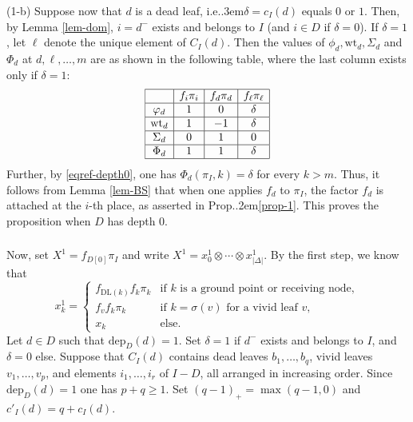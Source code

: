\documentclass[12pt]{amsart}
\numberwithin{equation}{section}
\theoremstyle{definition}
\def\Prop{Prop.\kern.2em}
\def\ie{{i.e.}\kern.3em}
\def\DL{\mathrm{DL}}  %
\def\dep{\mathrm{dep}} %
\def\wt{\mathrm{wt}}  %
\begin{document}
\smallskip (1-b) Suppose now that $d$ is a dead leaf, \ie $\delta = c_I(d)$ equals $0$ or $1$. 
Then, by Lemma \ref{lem-dom},  $i = d^-$ exists and belongs to $I$ (and $i\in D$ if $\delta =0$). 
If $\delta = 1$, let $\ell$ denote the unique element of $C_I(d)$. 
Then the values of $\phi_d, \wt_d, \Sigma_d$ and $\Phi_d$ at $d, \ell, \dots, m$ are as shown in the 
 following table, where the last column exists only if $\delta = 1$: 
$$
\begin{array}{|c|c|c|c|c|c|}
\hline 
 & f_i \pi_i & f_d \pi_d & f_\ell \pi_\ell  
\\
\hline 
\varphi_d & 1 & 0 & \delta  
\\
\hline 
\wt_d & 1 & -1 & \delta  
\\
\hline 
\Sigma_d & 0 &1 & 0  
\\
\hline 
\Phi_d & 1 & 1 & \delta  
\\
\hline
\end{array}
$$
Further, by \eqref{eqref-depth0}, one has $\Phi_d(\pi_I,k) = \delta$ for every $k > m$. 
Thus, it follows from Lemma \ref{lem-BS} that when one applies 
$f_d$ to $\pi_I$, the factor $f_d$ is attached at the $i$-th place, as asserted in \Prop \ref{prop-1}.  
This proves the proposition when $D$ has depth $0$. 


\subsubsection{}\label{subsub-depth1}  Now, set $X^1 = f_{D[0]} \pi_I$ and write $X^1 = x_0^1 \otimes \cdots \otimes x_{\vert \Delta\vert}^1$. 
By the first step, we know that 
\begin{equation}\label{eqref-X1} 
x_k^1 = 
\begin{cases} 
f_{\DL(k)} f_k \pi_k & \text{if $k$ is a ground point or receiving node}, 
\\
f_v f_k \pi_k & \text{if $k = \sigma(v)$ for a vivid leaf } v, 
\\
x_k & \text{else}. 
\end{cases} 
\end{equation} 
Let $d\in D$ such that $\dep_D(d) = 1$. Set $\delta = 1$ if $d^-$ exists and belongs to $I$, and $\delta = 0$ 
else. 
Suppose that $C_I(d)$ contains dead leaves $b_1,\dots, b_q$, vivid leaves $v_1,\dots, v_p$, and elements 
$i_1,\dots, i_r$ of $I - D$, all arranged in increasing order. Since $\dep_D(d) = 1$ one has $p+q \geq 1$. 
Set $(q-1)_+ = \max(q{-}1,0)$ and $c'_I(d) = q + c_I(d)$. 
\end{document}
